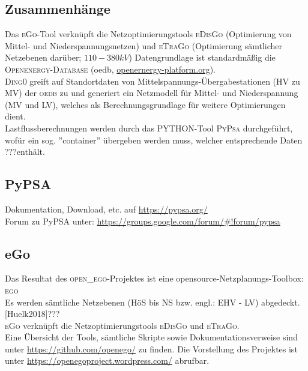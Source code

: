 \documentclass[
a4paper,     %
12pt         %
]{scrartcl}  %
\begin{document}
\subsection{Zusammenhänge}
Das \textsc{eGo}-Tool verknüpft die Netzoptimierungstools \textsc{eDisGo} (Optimierung von Mittel- und Niederspannungsnetzen) und \textsc{eTraGo} (Optimierung sämtlicher Netzebenen darüber; $110 - 380kV$)
Datengrundlage ist standardmäßig die \textsc{Openenergy-Database} (oedb, \url{openernergy-platform.org}).\\
\textsc{Ding0} greift auf Standortdaten von Mittelspannungs-Übergabestationen (HV zu MV) der \textsc{oedb} zu und generiert ein Netzmodell für Mittel- und Niederspannung (MV und LV), welches als Berechnungsgrundlage für weitere Optimierungen dient.\\
Lastflussberechnungen werden durch das \textsc{PYTHON}-Tool \textsc{PyPsa} durchgeführt, wofür ein sog. ''container'' übergeben werden muss, welcher entsprechende Daten ???enthält.\\
 

\subsection{PyPSA}
Dokumentation, Download, etc. auf
\url{https://pypsa.org/}\\

Forum zu PyPSA unter:
\url{https://groups.google.com/forum/#!forum/pypsa}

	

\subsection{eGo}
Das Resultat des \textsc{open\_ego}-Projektes ist eine opensource-Netzplanungs-Toolbox: \textsc{ego}\\
Es werden sämtliche Netzebenen (HöS bis NS bzw. engl.: EHV - LV) abgedeckt.
[Huelk2018]???\\
\textsc{eGo} verknüpft die Netzoptimierungstools \textsc{eDisGo} und \textsc{eTraGo}.\\
Eine Übersicht der Tools, sämtliche Skripte sowie Dokumentationsverweise sind unter \url{https://github.com/openego/} zu finden.
Die Vorstellung des Projektes ist unter  \url{https://openegoproject.wordpress.com/} abrufbar.
\end{document}
